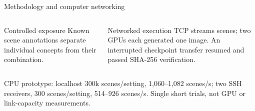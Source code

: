 \documentclass[aspectratio=169,11pt]{beamer}
\newcommand{\smallnote}[1]{{\par\vspace{1.5mm}\scriptsize\color{gray!80!black}#1\par}}
\begin{document}
\begin{frame}{Methodology and computer networking}
\begin{center}
\end{center}

\vspace{2mm}
\begin{columns}[T,onlytextwidth]
\begin{block}{Controlled exposure}
\small Known scene annotations separate individual concepts from their combination.
\end{block}

\begin{block}{Networked execution}
\small TCP streams scenes; two GPUs each generated one image. An interrupted checkpoint transfer resumed and passed SHA-256 verification.
\end{block}
\end{columns}

\vfill
\smallnote{CPU prototype: localhost 300k scenes/setting, 1,060--1,082 scenes/s; two SSH receivers, 300 scenes/setting, 514--926 scenes/s. Single short trials, not GPU or link-capacity measurements.}
\end{frame}
\end{document}
